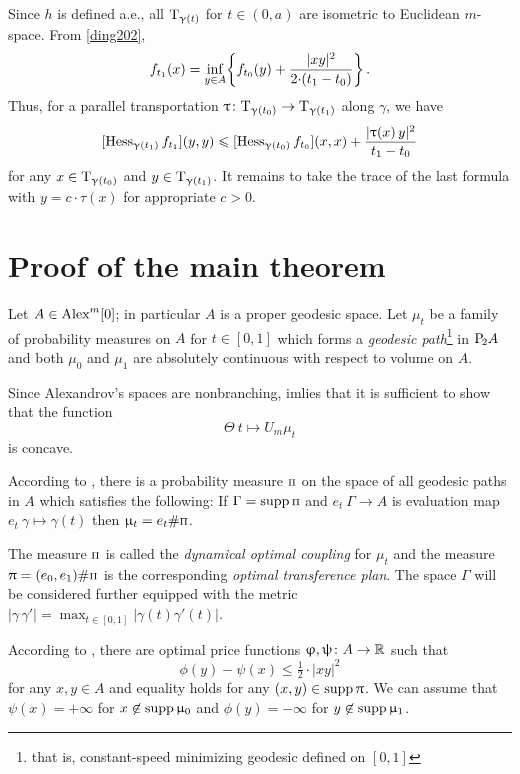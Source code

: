 \documentclass[oneside,a4paper]{article}
\begin{document}
Since $h$ is defined a.e., all $\text{\rm T}_{\upgamma(t)}$ for $t\in(0,a)$ are isometric to Euclidean $m$-space.
From \ref{ding202},
$$f_{t_1}(x)=\inf_{y\in A}\!\left\{f_{t_0}(y)+\frac{|x y|^2}{2{\cdot}(t_1-t_0)}\right\}.$$
Thus, for a parallel transportation $\uptau\colon\text{\rm T}_{\upgamma(t_0)}\to \text{\rm T}_{\upgamma(t_1)}$ along $\gamma$,
we have 
$$[\operatorname{Hess}_{\upgamma(t_1)}f_{t_1}](y,y)
\leqslant
[\operatorname{Hess}_{\upgamma(t_0)}f_{t_0}](x,x)
+\frac{|\uptau (x)\,y|^2}{t_1-t_0}$$
for any $x\in\text{\rm T}_{\upgamma(t_0)}$ and $y\in\text{\rm T}_{\upgamma(t_1)}$.
It remains to take the trace of the last formula with $y=c{\cdot}\tau(x)$ for appropriate $c>0$.
\qeds















\section{Proof of the main theorem}

Let $A\in\CBB m 0$; in particular $A$ is a proper geodesic space.
Let $\mu_t$ be a family of probability measures on $A$ for $t\in[0,1]$ which forms a \emph{geodesic path}\footnote{that is, constant-speed minimizing geodesic defined on $[0,1]$} in $\mathrm {P}_{\!2} A$ and both $\mu_0$ and $\mu_1$ are absolutely continuous with respect to volume on $A$.

Since Alexandrov's spaces are nonbranching,
\cite[30.32]{villani} imlies that
it is sufficient to show that the function 
$$\Theta\:t\mapsto U_m\mu_t$$ 
is concave.

\def\Pii{\text{\scriptsize $\Pi$}}

According to \cite[7.22]{villani}, there is a probability measure $\Pii$ on the space of all geodesic paths in $A$ which satisfies the following:
If $\Gamma=\supp\Pii$ and $e_t\:\Gamma\to A$ is evaluation map  
$e_t\:\gamma\mapsto\gamma(t)$ then $\mu_t=e_t\#\Pii$.

The measure $\Pii$ is called the  \emph{dynamical optimal coupling} for $\mu_t$ and the measure $\pi=(e_0,e_1)\#\Pii$ is the corresponding \emph{optimal transference plan}.
The space $\Gamma$ will be considered further equipped with the metric $|\gamma\,\gamma'|=\max_{t\in[0,1]}|\gamma(t)\gamma'(t)|$.

According to \cite[5.10]{villani}, there are optimal price functions
 $\upvarphi,\uppsi\colon A\to\mathbb{R}$ such that
$$\phi(y)-\psi(x)\le\tfrac12{\cdot}|x y|^2$$
for any $x,y\in A$ 
and equality holds for any $(x,y)\in\mathop{\rm supp}\nolimits\uppi$.
We can assume that $\psi(x)=+\infty$ for $x\not\in\mathop{\rm supp}\nolimits\upmu_0$ and $\phi(y)=-\infty$ for $y\not\in\mathop{\rm supp}\nolimits\upmu_1$.
\end{document}
